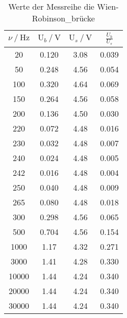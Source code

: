 \begin{table}[H]
  \centering
  \caption{Werte der Messreihe die Wien-Robinson_brücke}
  \label{tab:tabe5}
    \begin{tabular}{c c c c}
    \toprule
    $ \nu \: / \: \si{\hertz} $ & $\text{U}_b \: / \: \si{\volt} $ &
    $\text{U}_s \: / \: \si{\volt} $ &
    $\frac{U_b}{U_s}$ \\
    \midrule
    20 & 0.120 & 3.08 & 0.039 \\
    50 & 0.248 & 4.56 & 0.054 \\
    100 & 0.320 & 4.64 & 0.069 \\
    150 & 0.264 & 4.56 & 0.058 \\
    200 & 0.136 & 4.50 & 0.030 \\
    220 & 0.072 & 4.48 & 0.016 \\
    230 & 0.032 & 4.48 & 0.007 \\
    240 & 0.024 & 4.48 & 0.005 \\
    242 & 0.016 & 4.48 & 0.004 \\
    250 & 0.040 & 4.48 & 0.009 \\
    265 & 0.080 & 4.48 & 0.018 \\
    300 & 0.298 & 4.56 & 0.065 \\
    500 & 0.704 & 4.56 & 0.154 \\
    1000 & 1.17 & 4.32 & 0.271 \\
    3000 & 1.41 & 4.28 & 0.330 \\
    10000 & 1.44 & 4.24 & 0.340 \\
    20000 & 1.44 & 4.24 & 0.340 \\
    30000 & 1.44 & 4.24 & 0.340 \\

    \bottomrule
    \end{tabular}
\end{table}
